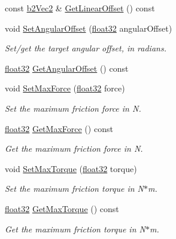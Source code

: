 \begin{DoxyCompactItemize}
const \mbox{\hyperlink{structb2_vec2}{b2\+Vec2}} \& \mbox{\hyperlink{classb2_motor_joint_a87a61f162e202e2f3c12200e42e3b180}{Get\+Linear\+Offset}} () const
\item 
void \mbox{\hyperlink{classb2_motor_joint_a14d7dca1767548ddffe293e39cafc3c7}{Set\+Angular\+Offset}} (\mbox{\hyperlink{b2_settings_8h_aacdc525d6f7bddb3ae95d5c311bd06a1}{float32}} angular\+Offset)
\begin{DoxyCompactList}\small\item\em Set/get the target angular offset, in radians. \end{DoxyCompactList}\item 
\mbox{\hyperlink{b2_settings_8h_aacdc525d6f7bddb3ae95d5c311bd06a1}{float32}} \mbox{\hyperlink{classb2_motor_joint_a4dc4e5ee4ec8615c3d712ea6cac48436}{Get\+Angular\+Offset}} () const
\item 
void \mbox{\hyperlink{classb2_motor_joint_a62f95f23d60123cebe14f2fcec155801}{Set\+Max\+Force}} (\mbox{\hyperlink{b2_settings_8h_aacdc525d6f7bddb3ae95d5c311bd06a1}{float32}} force)
\begin{DoxyCompactList}\small\item\em Set the maximum friction force in N. \end{DoxyCompactList}\item 
\mbox{\hyperlink{b2_settings_8h_aacdc525d6f7bddb3ae95d5c311bd06a1}{float32}} \mbox{\hyperlink{classb2_motor_joint_ac7353eace38d2593a523149abe8ec2b5}{Get\+Max\+Force}} () const
\begin{DoxyCompactList}\small\item\em Get the maximum friction force in N. \end{DoxyCompactList}\item 
void \mbox{\hyperlink{classb2_motor_joint_a3e9a259d36c36e0dc078282e6799d625}{Set\+Max\+Torque}} (\mbox{\hyperlink{b2_settings_8h_aacdc525d6f7bddb3ae95d5c311bd06a1}{float32}} torque)
\begin{DoxyCompactList}\small\item\em Set the maximum friction torque in N$\ast$m. \end{DoxyCompactList}\item 
\mbox{\hyperlink{b2_settings_8h_aacdc525d6f7bddb3ae95d5c311bd06a1}{float32}} \mbox{\hyperlink{classb2_motor_joint_a40d4e4e852a6a722708f0c47b5c9fd69}{Get\+Max\+Torque}} () const
\begin{DoxyCompactList}\small\item\em Get the maximum friction torque in N$\ast$m. \end{DoxyCompactList}\item 

\end{DoxyCompactItemize}
